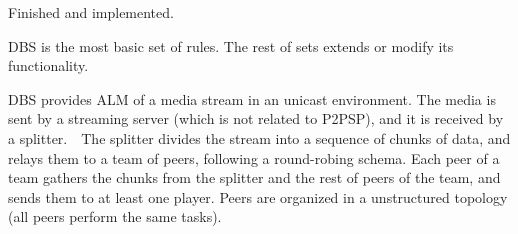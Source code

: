 
\label{sec:DBS}

\begin{notex}
  Finished and implemented.
\end{notex}

\acrshort{DBS} is the most basic set of rules. The rest of sets
extends or modify its functionality.

DBS provides \acrshort{ALM} of a \gls{media} \gls{stream} in an
\gls{unicast} environment. The media is sent by a streaming
\gls{server} (which is not related to P2PSP), and it is received by a
\gls{splitter}.~~The splitter divides
the stream into a sequence of \gls{chunk}s of data, and relays them to
a \gls{team} of peers, following a round-robing schema. Each peer of a
team gathers the chunks from the splitter and the rest of peers of the
team, and sends them to at least one \gls{player}. Peers are organized
in a unstructured topology (all peers perform the same tasks).

\begin{comment}
In single layered streams\footnote{Each layer of a
  scalable stream is received by a different peer attached to the same
  player capable or render scalable media.}, each peer is spawned by a
player (normal users should not run peers directly).
\end{comment}

\begin{comment}
/* quitar: We define the set of teams as
$\{T\}$,
and enumerate the peers in the team $T$ as $T=\{P_1,\cdots,P_{|T|}\}$. */
\end{comment}
